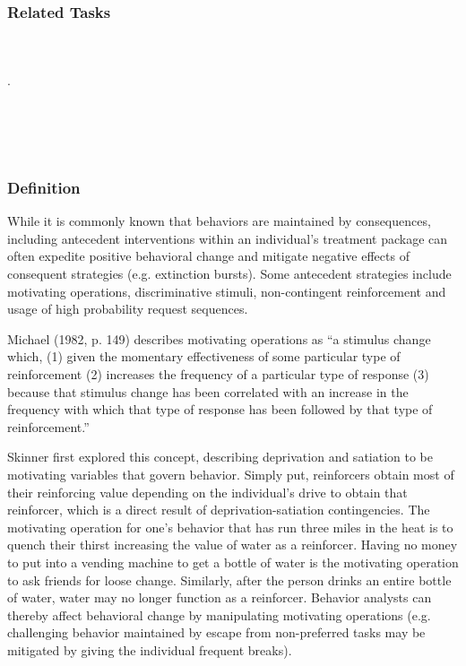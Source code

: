 \subsection{Related Tasks} 
\fourcOne{}\\
\fourdTwo{}\\.
\fourdNineteen{}\\
\fourfSeven{}\\
\fouriSeven{}\\
\fourjTwo{}\\
%
%
%
%
%
\chapter{\foursece{}}
%
\section[\foureOne{}]{\foureOne{}%
              }
\subsection{Definition}
While it is commonly known that behaviors are maintained by consequences, including antecedent interventions within an individual's treatment package can often expedite positive behavioral change and mitigate negative effects of consequent strategies (e.g. extinction bursts). Some antecedent strategies include motivating operations, discriminative stimuli, non-contingent reinforcement and usage of high probability request sequences.

Michael (1982, p. 149) describes motivating operations as ``a stimulus change which, (1) given the momentary effectiveness of some particular type of reinforcement (2) increases the frequency of a particular type of response (3) because that stimulus change has been correlated with an increase in the frequency with which that type of response has been followed by that type of reinforcement.''

Skinner first explored this concept, describing deprivation and satiation to be motivating variables that govern behavior. Simply put, reinforcers obtain most of their reinforcing value depending on the individual's drive to obtain that reinforcer, which is a direct result of deprivation-satiation contingencies. The motivating operation for one's behavior that has run three miles in the heat is to quench their thirst increasing the value of water as a reinforcer. Having no money to put into a vending machine to get a bottle of water is the motivating operation to ask friends for loose change. Similarly, after the person drinks an entire bottle of water, water may no longer function as a reinforcer. Behavior analysts can thereby affect behavioral change by manipulating motivating operations (e.g. challenging behavior maintained by escape from non-preferred tasks may be mitigated by giving the individual frequent breaks). 

